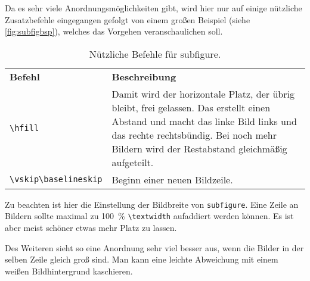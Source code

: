 Da es sehr viele Anordnungsmöglichkeiten gibt, wird hier nur auf einige nützliche Zusatzbefehle eingegangen gefolgt von einem großen Beispiel (siehe \autoref{fig:subfigbsp}), welches das Vorgehen veranschaulichen soll.

\begin{table}[h]
	\centering
	\caption{Nützliche Befehle für subfigure.}
	\label{tab:subfigcommands}
	\begin{tabular}{@{}L{0.27\textwidth}L{0.63\textwidth}@{}}
		{\color[HTML]{FFFFFF} \textbf{Befehl}} & {\color[HTML]{FFFFFF} \textbf{Beschreibung}}\\
		
		\verb|\hfill| & Damit wird der horizontale Platz, der übrig bleibt, frei gelassen. Das erstellt einen Abstand und macht das linke Bild links und das rechte rechtsbündig. Bei noch mehr Bildern wird der Restabstand gleichmäßig aufgeteilt.\\
		
		\verb|\vskip\baselineskip| & Beginn einer neuen Bildzeile.
	\end{tabular}
\end{table}

Zu beachten ist hier die Einstellung der Bildbreite von \verb|subfigure|. Eine Zeile an Bildern sollte maximal zu \SI{100}{\percent} \verb|\textwidth| aufaddiert werden können. Es ist aber meist schöner etwas mehr Platz zu lassen.

Des Weiteren sieht so eine Anordnung sehr viel besser aus, wenn die Bilder in der selben Zeile gleich groß sind. Man kann eine leichte Abweichung mit einem weißen Bildhintergrund kaschieren.

